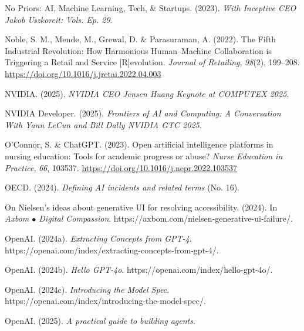 \documentclass[
  letterpaper,
  DIV=11,
  numbers=noendperiod]{scrartcl}
\newlength{\cslhangindent}
\newenvironment{CSLReferences}[2] %
 {\begin{list}{}{%
  \setlength{\itemindent}{0pt}
  \setlength{\leftmargin}{0pt}
  \setlength{\parsep}{0pt}
  \ifodd #1
   \setlength{\leftmargin}{\cslhangindent}
   \setlength{\itemindent}{-1\cslhangindent}
  \fi
  \setlength{\itemsep}{#2\baselineskip}}}
 {\end{list}}
\begin{document}
\begin{CSLReferences}{1}{0}
No Priors: AI, Machine Learning, Tech, \& Startups. (2023). \emph{With
{Inceptive CEO Jakob Uszkoreit}: Vols. Ep. 29}.

Noble, S. M., Mende, M., Grewal, D. \& Parasuraman, A. (2022). The
{Fifth Industrial Revolution}: {How Harmonious Human}--{Machine
Collaboration} is {Triggering} a {Retail} and {Service}
{[}{R}{]}evolution. \emph{Journal of Retailing}, \emph{98}(2), 199--208.
\url{https://doi.org/10.1016/j.jretai.2022.04.003}

NVIDIA. (2025). \emph{{NVIDIA CEO Jensen Huang Keynote} at {COMPUTEX}
2025}.

NVIDIA Developer. (2025). \emph{Frontiers of {AI} and {Computing}: {A
Conversation With Yann LeCun} and {Bill Dally} {\textbar} {NVIDIA GTC}
2025}.

O'Connor, S. \& ChatGPT. (2023). Open artificial intelligence platforms
in nursing education: {Tools} for academic progress or abuse?
\emph{Nurse Education in Practice}, \emph{66}, 103537.
\url{https://doi.org/10.1016/j.nepr.2022.103537}

OECD. (2024). \emph{Defining {AI} incidents and related terms} (No. 16).

On {Nielsen}'s ideas about generative {UI} for resolving accessibility.
(2024). In \emph{Axbom {\(\bullet\)} Digital Compassion}.
https://axbom.com/nielsen-generative-ui-failure/.

OpenAI. (2024a). \emph{Extracting {Concepts} from {GPT-4}}.
https://openai.com/index/extracting-concepts-from-gpt-4/.

OpenAI. (2024b). \emph{Hello {GPT-4o}}.
https://openai.com/index/hello-gpt-4o/.

OpenAI. (2024c). \emph{Introducing the {Model Spec}}.
https://openai.com/index/introducing-the-model-spec/.

OpenAI. (2025). \emph{A practical guide to building agents}.


\end{CSLReferences}
\end{document}
